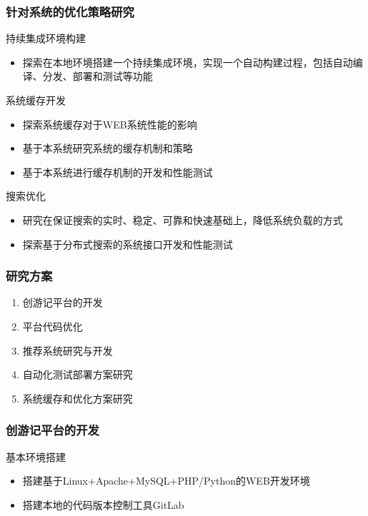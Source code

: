 \documentclass{beamer}
\begin{document}
\begin{frame}
  \frametitle{针对系统的优化策略研究}
  \begin{block}{持续集成环境构建 }
    \begin{itemize}
      \item 探索在本地环境搭建一个持续集成环境，实现一个自动构建过程，包括自动编译、分发、部署和测试等功能
    \end{itemize}
  \end{block}
  \pause %
  \begin{block}{系统缓存开发}
  	\begin{itemize}
  		\item 探索系统缓存对于WEB系统性能的影响
      \item 基于本系统研究系统的缓存机制和策略
      \item 基于本系统进行缓存机制的开发和性能测试
  	\end{itemize}
  \end{block}
  \pause %
  \begin{block}{搜索优化 }
  	\begin{itemize}
  		\item 研究在保证搜索的实时、稳定、可靠和快速基础上，降低系统负载的方式
      \item 探索基于分布式搜索的系统接口开发和性能测试
  	\end{itemize}
  \end{block}
\end{frame}

\begin{frame}
  \frametitle{研究方案}
  \begin{enumerate}
      \item<1-> 创游记平台的开发
      \item<1-> 平台代码优化
      \item<1-> 推荐系统研究与开发
      \item<1-> 自动化测试部署方案研究
      \item<1-> 系统缓存和优化方案研究
  \end{enumerate}
\end{frame}

\begin{frame}
  \frametitle{创游记平台的开发}
  \begin{block}{基本环境搭建 }
	  \begin{itemize}
		  \item 搭建基于Linux+Apache+MySQL+PHP/Python的WEB开发环境
      \item 搭建本地的代码版本控制工具GitLab
	  \end{itemize}
  \end{block}
\end{frame}
\end{document}
